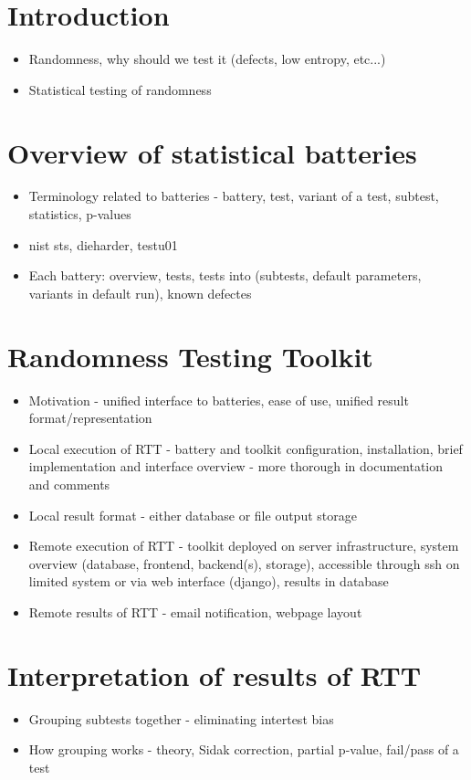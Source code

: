 \documentclass[
  digital,  	%
  color,		%
  oneside,   	%
  12pt,
  nocover,
  table,
  nolof,
  nolot,
]{fithesis3}
\begin{document}
\chapter{Introduction}
\begin{itemize}
\item Randomness, why should we test it (defects, low entropy, etc...)
\item Statistical testing of randomness
\end{itemize}

\chapter{Overview of statistical batteries}
\begin{itemize}
\item Terminology related to batteries - battery, test, variant of a test, subtest, statistics, p-values
\item nist sts, dieharder, testu01
\item Each battery: overview, tests, tests into (subtests, default parameters, variants in default run), known defectes
\end{itemize}

\chapter{Randomness Testing Toolkit}
\begin{itemize}
\item Motivation - unified interface to batteries, ease of use, unified result format/representation
\item Local execution of RTT - battery and toolkit configuration, installation, brief implementation and interface overview - more thorough in documentation and comments
\item Local result format - either database or file output storage
\item Remote execution of RTT - toolkit deployed on server infrastructure, system overview (database, frontend, backend(s), storage), accessible through ssh on limited system or via web interface (django), results in database
\item Remote results of RTT - email notification, webpage layout
\end{itemize}

\chapter{Interpretation of results of RTT}
\begin{itemize}
\item Grouping subtests together - eliminating intertest bias
\item How grouping works - theory, Sidak correction, partial p-value, fail/pass of a test
\end{itemize}
 
\end{document}
